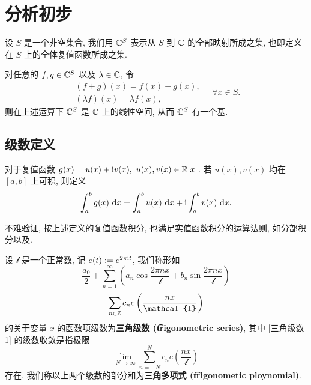 \chapter{\fly 分析初步}

\begin{definition*}
	设 $S$ 是一个非空集合, 我们用 $\mathbb C^S$ 表示从 $S$ 到 $\mathbb C$ 的全部映射所成之集, 也即定义在 $S$ 上的全体复值函数所成之集.
\end{definition*}
对任意的 $f,g\in\mathbb C^S$ 以及 $\lambda\in \mathbb C$, 令
\begin{equation*}
	\begin{array}{c}
		(f+g)(x)=f(x)+g(x), \\
		(\lambda f)(x)=\lambda f(x),
	\end{array}
	\quad\forall x\in S.
\end{equation*}
则在上述运算下 $\mathbb C^S$ 是 $\mathbb C$ 上的线性空间, 从而 $\mathbb C^S$ 有一个基.

\section{\fly 级数定义}

\begin{definition}[复值函数积分]
	对于复值函数 $g(x)=u(x)+\t i v(x),\ u(x),v(x)\in \R[x]$. 若 $u(x),v(x)$ 均在 $[a,b]$ 上可积, 则定义 $$\int_a^b g(x)\ \text {d} x=\int_a^b u(x)\ \text {d} x+\text {i}\int_a^b v(x)\ \text {d} x.$$
\end{definition}

不难验证, 按上述定义的复值函数积分, 也满足实值函数积分的运算法则, 如分部积分以及.

\begin{definition}\label{三角级数}\label{三角多项式}
	设 $\mathcal{l}$ 是一个正常数, 记 $e(t):=e^{2\pi \text {i} t}$, 我们称形如
	\begin{equation}\label{三角级数1}
		\frac{a_0} 2+\sum\limits_{n=1}^\infty\left(a_n\cos\frac{2\pi nx}{\mathcal l}+b_n\sin\frac{2\pi nx}{\mathcal l}\right)
	\end{equation}
	\begin{equation}\label{三角级数2}
		\sum\limits_{n\in\Z} c_ne\left(\frac{nx}{\mathcal{l}}\right)
	\end{equation}
	的关于变量 $x$ 的函数项级数为\textbf{三角级数 (\t{trigonometric series})}, 其中 \eqref{三角级数1} 的级数收敛是指极限 $$\lim\limits_{N\to\infty}\sum\limits_{n=-N}^N c_ne\left(\frac{nx}{\mathcal l}\right)$$ 存在. 我们称以上两个级数的部分和为\textbf{三角多项式 (\t{trigonometic ploynomial})}.
\end{definition}

